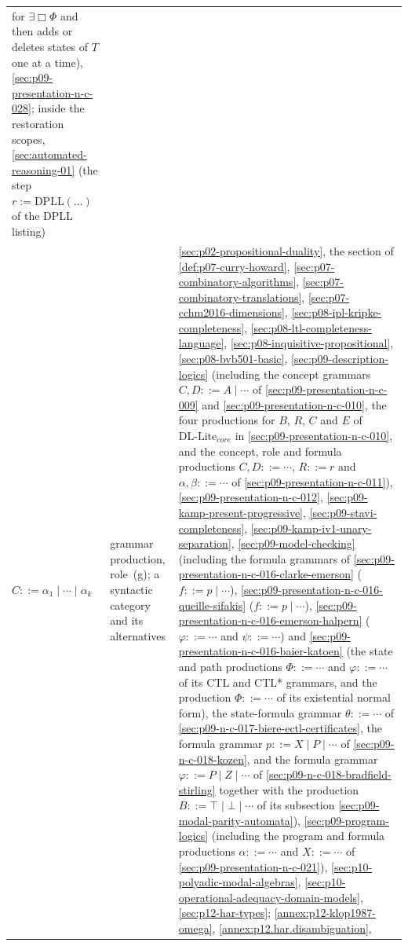 \begin{longtable}{@{}p{}p{}p{}@{}}
for \(\exists\Box\Phi\) and then adds or deletes states of \(T\) one at a
time),
\cref{sec:p09-presentation-n-c-028}; inside the restoration scopes,
\cref{sec:automated-reasoning-01} (the step \(r:=\mathrm{DPLL}(\ldots)\) of
the DPLL listing) \\
\(C::=\alpha_1\mid\cdots\mid\alpha_k\) & grammar production, role~(g);
a syntactic category and its alternatives &
\cref{sec:p02-propositional-duality}, the section of
\cref{def:p07-curry-howard}, \cref{sec:p07-combinatory-algorithms},
\cref{sec:p07-combinatory-translations}, \cref{sec:p07-cchm2016-dimensions},
\cref{sec:p08-ipl-kripke-completeness},
\cref{sec:p08-ltl-completeness-language},
\cref{sec:p08-inquisitive-propositional}, \cref{sec:p08-bvb501-basic},
\cref{sec:p09-description-logics} (including the concept grammars
\(C,D::=A\mid\cdots\) of \cref{sec:p09-presentation-n-c-009} and
\cref{sec:p09-presentation-n-c-010}, the four productions for
\(B\), \(R\), \(C\) and \(E\) of \(\mathrm{DL\mbox{-}Lite}_{core}\) in
\cref{sec:p09-presentation-n-c-010}, and the concept, role and formula
productions \(C,D::=\cdots\), \(R::=r\) and \(\alpha,\beta::=\cdots\) of
\cref{sec:p09-presentation-n-c-011}),
\cref{sec:p09-presentation-n-c-012},
\cref{sec:p09-kamp-present-progressive}, \cref{sec:p09-stavi-completeness},
\cref{sec:p09-kamp-iv1-unary-separation}, \cref{sec:p09-model-checking}
(including the formula grammars of
\cref{sec:p09-presentation-n-c-016-clarke-emerson} (\(f::=p\mid\cdots\)),
\cref{sec:p09-presentation-n-c-016-queille-sifakis} (\(f::=p\mid\cdots\)),
\cref{sec:p09-presentation-n-c-016-emerson-halpern} (\(\varphi::=\cdots\)
and \(\psi::=\cdots\)) and \cref{sec:p09-presentation-n-c-016-baier-katoen}
(the state and path productions \(\Phi::=\cdots\) and \(\varphi::=\cdots\)
of its CTL and CTL* grammars, and the production \(\Phi::=\cdots\) of
its existential normal form), the state-formula grammar \(\theta::=\cdots\)
of \cref{sec:p09-n-c-017-biere-ectl-certificates}, the formula grammar
\(p::=X\mid P\mid\cdots\) of \cref{sec:p09-n-c-018-kozen}, and the
formula grammar \(\varphi::=P\mid Z\mid\cdots\) of
\cref{sec:p09-n-c-018-bradfield-stirling} together with the production
\(B::=\top\mid\bot\mid\cdots\) of its subsection
\cref{sec:p09-modal-parity-automata}),
\cref{sec:p09-program-logics} (including the program and formula
productions \(\alpha::=\cdots\) and \(X::=\cdots\) of
\cref{sec:p09-presentation-n-c-021}), \cref{sec:p10-polyadic-modal-algebras},
\cref{sec:p10-operational-adequacy-domain-models}, \cref{sec:p12-har-types};
\cref{annex:p12-klop1987-omega}, \cref{annex:p12.har.disambiguation},

\end{longtable}
